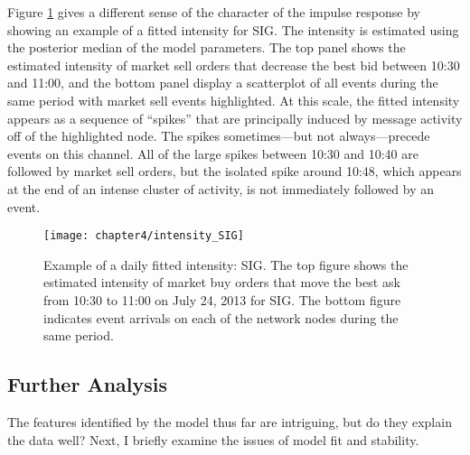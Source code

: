 		Figure \ref{fig:intensity_SIG} gives a different sense of the character of the impulse response by showing an example of a fitted intensity for SIG. The intensity is estimated using the posterior median of the model parameters. The top panel shows the estimated intensity of market sell orders that decrease the best bid between 10:30 and 11:00, and the bottom panel display a scatterplot of all events during the same period with market sell events highlighted. At this scale, the fitted intensity appears as a sequence of ``spikes'' that are principally induced by message activity off of the highlighted node. The spikes sometimes---but not always---precede events on this channel. All of the large spikes between 10:30 and 10:40 are followed by market sell orders, but the isolated spike around 10:48, which appears at the end of an intense cluster of activity, is not immediately followed by an event.

		\begin{figure}[p]
			\small
			\linespread{1}
			\centering
			\texttt{[image: chapter4/intensity\_SIG]}
			\captionsetup{skip=-20pt, labelsep=colon, font=footnotesize, width=\linewidth}
			\caption[Example of a daily fitted intensity: SIG]{Example of a daily fitted intensity: SIG. The top figure shows the estimated intensity of market buy orders that move the best ask from 10:30 to 11:00 on July 24, 2013 for SIG. The bottom figure indicates event arrivals on each of the network nodes during the same period.}
			\label{fig:intensity_SIG}
		\end{figure}

	\subsection{Further Analysis}
		The features identified by the model thus far are intriguing, but do they explain the data well? Next, I briefly examine the issues of model fit and stability.

